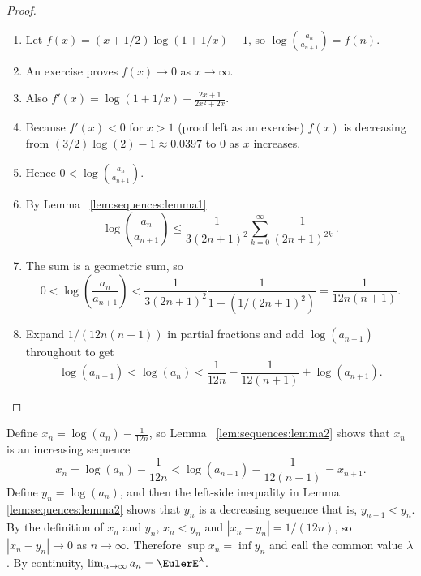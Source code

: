 \documentclass[12pt]{article}
\begin{document}
\begin{proof}
    \begin{enumerate}
        \item
            Let \( f(x) = (x + 1/2)\log(1 + 1/x) - 1 \), so \( \log
            \left( \frac {a_n}{a_{n+1}} \right) = f(n) \).
        \item
            An exercise proves \( f(x) \to 0 \) as \( x \to \infty \).
        \item
            Also \( f'(x) = \log(1 + 1/x) - \frac{2x + 1}{2x^2 + 2x} \).
        \item
            Because \( f'(x) < 0 \) for \( x > 1 \) (proof left as an
            exercise) \( f(x) \) is decreasing from \( (3/2)\log(2) - 1
            \approx 0.0397 \) to \( 0 \) as \( x \) increases.
        \item
            Hence \( 0 < \log \left(\frac {a_n}{a_{n+1}} \right) \).
        \item
            By Lemma~%
            \ref{lem:sequences:lemma1}
            \[
                \log \left(\frac{a_n}{a_{n+1}} \right) \le \frac{1}{3(2n+1)^2}
                \sum_{k=0}^{\infty} \frac{1}{(2n+1)^{2k}}\,.
            \]
        \item
            The sum is a geometric sum, so
            \[
                0 < \log \left(\frac{a_n}{a_{n+1}} \right) < \frac{1}{3(2n+1)^2}
                \frac{1}{1 - (1/(2n+1)^2)} = \frac{1}{12n(n+1)}.
            \]
        \item
            Expand \( 1/(12n(n+1)) \) in partial fractions and add \(
            \log(a_{n+1}) \) throughout to get
            \[
                \log(a_{n+1} ) < \log(a_n ) < \frac{1}{12n} - \frac{1}{12
                (n+1)} + \log(a_{n+1} ).
            \]
    \end{enumerate}
\end{proof}

Define \( x_n = \log(a_{n} ) - \frac{1}{12n} \), so Lemma~%
\ref{lem:sequences:lemma2} shows that \( x_n \) is an increasing
sequence
\begin{equation}
    x_n = \log(a_n) -\frac{1}{12n} < \log(a_{n+1}) - \frac{1}{12(n+1)} =
    x_{n+1}.%
    \label{eq:sequences:inequality}
\end{equation}
Define \( y_n = \log(a_n) \), and then the left-side inequality in
Lemma~%
\ref{lem:sequences:lemma2} shows that \( y_{n} \) is a decreasing
sequence that is, \( y_{n+1} < y_n \).  By the definition of \( x_n \)
and \( y_n \), \( x_n < y_n \) and \( |x_n - y_n| = 1/(12n) \), so \( |x_n
- y_n| \to 0 \) as \( n \to \infty \).  Therefore \( \sup x_{n}= \inf y_
{n} \) and call the common value \( \lambda \).  By continuity, \( \lim_
{n \to \infty} a_{n} = \EulerE^\lambda \).
\end{document}
